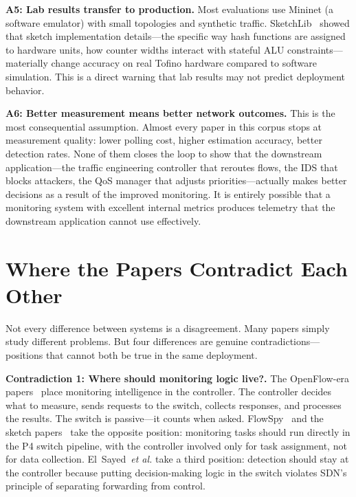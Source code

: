 \documentclass[letterpaper,twocolumn,10pt]{article}
\newcommand{\etal}{\textit{et al.}\xspace}
\newcommand{\para}[1]{\smallskip\noindent\textbf{#1.}}
\begin{document}
\para{A5: Lab results transfer to production}
Most evaluations use Mininet (a software emulator) with small
topologies and synthetic traffic.
SketchLib~\cite{namkung2022sketchlib} showed that sketch
implementation details---the specific way hash functions are
assigned to hardware units, how counter widths interact with
stateful ALU constraints---materially change accuracy on real
Tofino hardware compared to software simulation. This is a direct
warning that lab results may not predict deployment behavior.

\para{A6: Better measurement means better network outcomes}
This is the most consequential assumption. Almost every paper in
this corpus stops at measurement quality: lower polling cost,
higher estimation accuracy, better detection rates. None of them
closes the loop to show that the downstream application---the
traffic engineering controller that reroutes flows, the IDS that
blocks attackers, the QoS manager that adjusts
priorities---actually makes better decisions as a result of the
improved monitoring. It is entirely possible that a monitoring
system with excellent internal metrics produces telemetry that the
downstream application cannot use effectively.

\section{Where the Papers Contradict Each Other}
\label{sec:contradictions}

Not every difference between systems is a disagreement. Many
papers simply study different problems. But four differences are
genuine contradictions---positions that cannot both be true in
the same deployment.

\para{Contradiction 1: Where should monitoring logic live?}
The OpenFlow-era papers~\cite{adrichem2014opennetmon,
chowdhury2014payless, su2014flowcover} place monitoring
intelligence in the controller. The controller decides what to
measure, sends requests to the switch, collects responses, and
processes the results. The switch is passive---it counts when
asked.
FlowSpy~\cite{guan2019flowspy} and the sketch
papers~\cite{namkung2023sketchovsky} take the opposite position:
monitoring tasks should run directly in the P4 switch pipeline,
with the controller involved only for task assignment, not for
data collection.
El~Sayed~\etal\cite{elsayed2022ddos} take a third position:
detection should stay at the controller because putting
decision-making logic in the switch violates SDN's principle of
separating forwarding from control.
\end{document}
